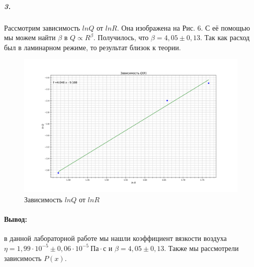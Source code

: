 \documentclass[a4paper,12pt]{article}
\begin{document}
\newpage
\subparagraph{3.}Рассмотрим зависимость $ln Q$ от $ln R$. Она изображена на Рис. 6. С её помощью мы можем найти $\beta$ в $Q\propto R^{\beta}$. Получилось, что $\beta = 4,05\pm 0,13$. Так как расход был в ламинарном режиме, то результат близок к теории.
\begin{figure}[!h]
\centering
\includegraphics[width=1\linewidth]{Q(r).png}
\caption{Зависимость $ln Q$ от $ln R$}
\label{fig:mpr}
\end{figure}
\paragraph{Вывод:} в данной лабораторной работе мы нашли коэффициент вязкости воздуха $\eta = 1,99\cdot 10^{-5}\pm 0,06\cdot 10^{-5}~ Па\cdot с$ и $\beta = 4,05\pm 0,13$. Также мы рассмотрели зависимость $P(x)$.
\end{document}
